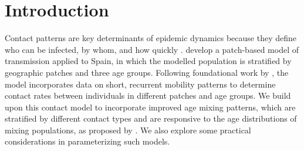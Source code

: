 \section{Introduction}\label{intro}
Contact patterns are key determinants of epidemic dynamics
because they define who can be infected, by whom, and how quickly \cite{Mossong2008}.
\citet{Arenas2020} develop a patch-based model of \sarscovii transmission applied to Spain,
in which the modelled population is stratified by geographic patches and three age groups.
Following foundational work by \citet{Balcan2011,Sattenspiel1995},
the model incorporates data on short, recurrent mobility patterns
to determine contact rates between individuals in different patches and age groups.
We build upon this contact model to incorporate improved age mixing patterns,
which are stratified by different contact types and are responsive to
the age distributions of mixing populations, as proposed by \citet{Arregui2018}.
We also explore some practical considerations in parameterizing such models.
